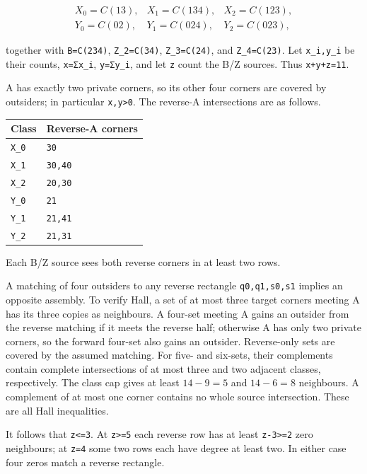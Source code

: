 \documentclass[
  10pt,
]{article}
\begin{document}
\[
\begin{array}{lll}
X_0=C(13),&X_1=C(134),&X_2=C(123),\\
Y_0=C(02),&Y_1=C(024),&Y_2=C(023),
\end{array}
\]

together with \texttt{B=C(234)}, \texttt{Z\_2=C(34)},
\texttt{Z\_3=C(24)}, and \texttt{Z\_4=C(23)}. Let \texttt{x\_i,y\_i} be
their counts, \texttt{x=Σx\_i}, \texttt{y=Σy\_i}, and let \texttt{z}
count the B/Z sources. Thus \texttt{x+y+z=11}.

A has exactly two private corners, so its other four corners are covered
by outsiders; in particular \texttt{x,y\textgreater{}0}. The reverse-A
intersections are as follows.

\begin{longtable}[]{@{}ll@{}}
\toprule\noalign{}
Class & Reverse-A corners \\
\midrule\noalign{}
\endhead
\bottomrule\noalign{}
\endlastfoot
\texttt{X\_0} & \texttt{30} \\
\texttt{X\_1} & \texttt{30,40} \\
\texttt{X\_2} & \texttt{20,30} \\
\texttt{Y\_0} & \texttt{21} \\
\texttt{Y\_1} & \texttt{21,41} \\
\texttt{Y\_2} & \texttt{21,31} \\
\end{longtable}

Each B/Z source sees both reverse corners in at least two rows.

A matching of four outsiders to any reverse rectangle
\texttt{q0,q1,s0,s1} implies an opposite assembly. To verify Hall, a set
of at most three target corners meeting A has its three copies as
neighbours. A four-set meeting A gains an outsider from the reverse
matching if it meets the reverse half; otherwise A has only two private
corners, so the forward four-set also gains an outsider. Reverse-only
sets are covered by the assumed matching. For five- and six-sets, their
complements contain complete intersections of at most three and two
adjacent classes, respectively. The class cap gives at least \(14-9=5\)
and \(14-6=8\) neighbours. A complement of at most one corner contains
no whole source intersection. These are all Hall inequalities.

It follows that \texttt{z\textless{}=3}. At \texttt{z\textgreater{}=5}
each reverse row has at least \texttt{z-3\textgreater{}=2} zero
neighbours; at \texttt{z=4} some two rows each have degree at least two.
In either case four zeros match a reverse rectangle.
\end{document}

